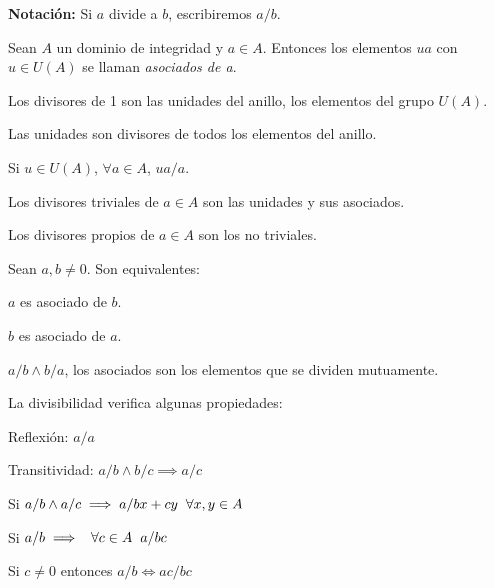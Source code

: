 \textbf{Notación:} Si $a$ divide a $b$, escribiremos $a/b$.

\begin{ndef}
  Sean $A$ un dominio de integridad y $a\in A$. Entonces los elementos $ua$ con $u\in U(A)$ se llaman \emph{asociados de a}.
\end{ndef}

\begin{nprop}\hfill
  \begin{nlist}
  \item Los divisores de 1 son las unidades del anillo, los elementos del grupo $U(A)$.
  \item Las unidades son divisores de todos los elementos del anillo.
  \item Si $u\in U(A)$, $\forall a \in A$, $ua/a$.

  \end{nlist}
\end{nprop}

\begin{ndef}
	Los divisores triviales de $a \in A$ son las unidades y sus asociados.
\end{ndef}

\begin{ndef}
  Los divisores propios de $a \in A$ son los no triviales.
\end{ndef}

\begin{nprop}
	Sean $a,b\neq 0$. Son equivalentes:
	\begin{nlist}
	\item $a$ es asociado de $b$.
	\item $b$ es asociado de $a$.
	\item $a/b \wedge b/a$, los asociados son los elementos que se dividen mutuamente.

\end{nlist}
\end{nprop}

\begin{nprop} La divisibilidad verifica algunas propiedades:

  \begin{nlist}
  \item Reflexión: $a/a$
  \item Transitividad: $a/b \wedge b/c \implies a/c$
  \item Si $a/b \wedge a/c \implies a/bx +cy\hspace{0.2cm} \forall x,y \in A$
  \item Si $a/b \implies \hspace{0.2cm} \forall c\in A \hspace{0.2cm} a/bc$
  \item Si $c\neq 0$ entonces $a/b \iff ac/bc$
  \end{nlist}
\end{nprop}


